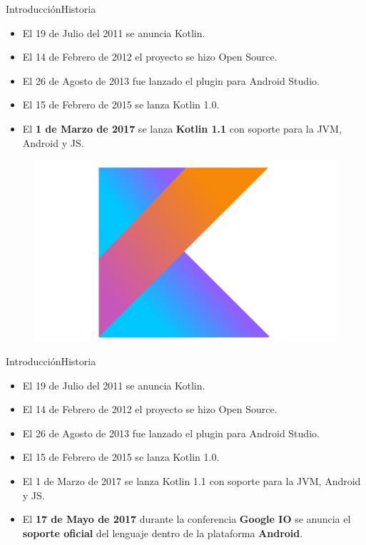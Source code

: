 \begin{frame}{Introducción}{Historia}
 \begin{itemize}
  \item El 19 de Julio del 2011 se anuncia Kotlin.
  \item El 14 de Febrero de 2012 el proyecto se hizo Open Source.
  \item El 26 de Agosto de 2013 fue lanzado el plugin para Android Studio.
  \item El 15 de Febrero de 2015 se lanza Kotlin 1.0.
  \item El \textbf{1 de Marzo de 2017} se lanza \textbf{Kotlin 1.1} con soporte para la JVM, Android y JS.
 \end{itemize}
 \begin{figure}[!htb]
  \endminipage
  \includegraphics[width=\linewidth]{images/introduction/kotlin_logo_2}
  \endminipage
  \endminipage
 \end{figure}
\end{frame}
\begin{frame}{Introducción}{Historia}
 \begin{itemize}
  \item El 19 de Julio del 2011 se anuncia Kotlin.
  \item El 14 de Febrero de 2012 el proyecto se hizo Open Source.
  \item El 26 de Agosto de 2013 fue lanzado el plugin para Android Studio.
  \item El 15 de Febrero de 2015 se lanza Kotlin 1.0.
  \item El 1 de Marzo de 2017 se lanza Kotlin 1.1 con soporte para la JVM, Android y JS.
  \item El \textbf{17 de Mayo de 2017} durante la conferencia \textbf{Google I\/O} se anuncia el \textbf{soporte oficial}
        del lenguaje dentro de la plataforma \textbf{Android}.
 \end{itemize}
\end{frame}
